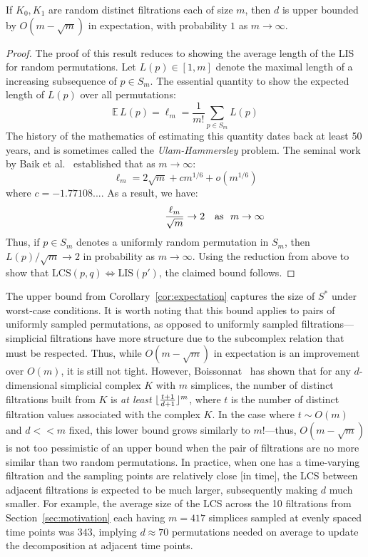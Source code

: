 \documentclass{siamart190516}
\DeclarePairedDelimiter\floor{\lfloor}{\rfloor}
\begin{document}
\begin{corollary}\label{cor:expectation}
	If $K_0, K_1$ are random distinct filtrations each of size $m$, then $d$ is upper bounded by $O(m - \sqrt{m})$ in expectation, with probability $1$ as $m \to \infty$.
\end{corollary}
\begin{proof}
	The proof of this result reduces to showing the average length of the LIS for random permutations. Let $L(p) \in [1,m]$ denote the maximal length of a increasing subsequence of $p \in S_m$. 
	The essential quantity to show the expected length of $L(p)$ over all permutations: 
	$$ \mathbb{E} \, L(p) = \ell_m = \frac{1}{m!} \sum\limits_{p \in S_m} L(p)$$
	The history of the mathematics of estimating this quantity dates back at least 50 years, and is sometimes called the \emph{Ulam-Hammersley} problem. The seminal work by Baik et al.~\cite{baik1999distribution} established that as $m \to \infty$:
	$$ \displaystyle \ell_m = 2 \sqrt{m} + c m^{1/6} + o(m^{1/6}) $$
where $c = -1.77108...$. As a result, we have: 
$$ \frac{\ell_m}{\sqrt{m}} \to 2\rlap{\quad \text{as } $m \to \infty$} $$	 
Thus, if $p \in S_m$ denotes a uniformly random permutation in $S_m$, then $L(p)/\sqrt{m} \to 2$ in probability as $m \to \infty$. Using the reduction from above to show that $\mathrm{LCS}(p,q) \Leftrightarrow \mathrm{LIS}(p')$, the claimed bound follows.
\end{proof}
\noindent The upper bound from Corollary~\ref{cor:expectation} captures the size of $S^\ast$ under worst-case conditions. 
It is worth noting that this bound applies to pairs of uniformly sampled permutations, as opposed to uniformly sampled  filtrations---simplicial filtrations have more structure due to the subcomplex relation that must be respected. 
Thus, while $O(m - \sqrt{m})$ in expectation is an improvement over $O(m)$, it is still not tight. However, Boissonnat~\cite{boissonnat2018efficient} has shown that for any $d$-dimensional simplicial complex $K$ with $m$ simplices, the number of distinct filtrations built from $K$ is \emph{at least} $\floor{\frac{t+1}{d+1}}^m$, where $t$ is the number of distinct filtration values associated with the complex $K$. 
In the case where $t \sim O(m)$ and $d << m$ fixed, this lower bound grows similarly to $m!$---thus, $O(m - \sqrt{m})$ is not too pessimistic of an upper bound when the pair of filtrations are no more similar than two random permutations. 
In practice, when one has a time-varying filtration and the sampling points are relatively close [in time], the LCS between adjacent filtrations is expected to be much larger, subsequently making $d$ much smaller. 
For example, the average size of the LCS across the 10 filtrations from Section~\ref{sec:motivation} each having $m=417$ simplices sampled at evenly spaced time points was $343$, implying $d \approx 70$ permutations needed on average to update the decomposition at adjacent time points.    
 
\end{document}
